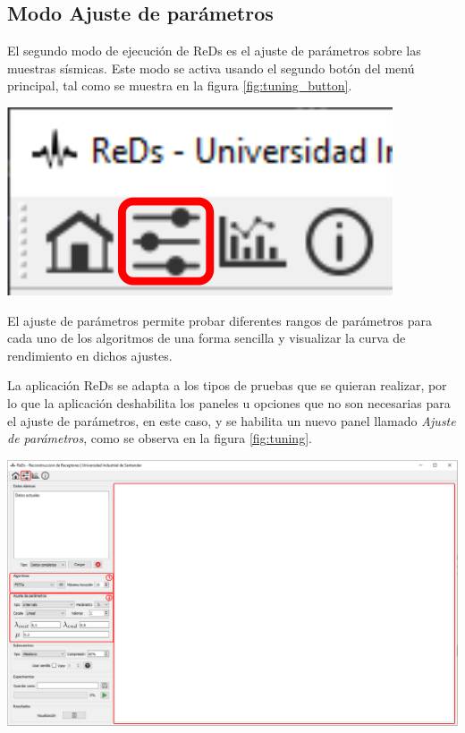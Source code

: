 \documentclass[12pt,twoside,letter]{ol-softwaremanual}
\newenvironment{Figure}
  {\par\medskip\noindent\minipage{\linewidth}}
  {\endminipage\par\medskip}
\begin{document}
\newpage
\subsection{Modo Ajuste de parámetros}

\begin{multicols}{2}

El segundo modo de ejecución de ReDs es el ajuste de parámetros sobre las muestras sísmicas. Este modo se activa usando el segundo botón del menú principal, tal como se muestra en la figura \ref{fig:tuning_button}.

\begin{Figure}
    \centering
    \includegraphics[width=0.4\linewidth]{tuning-tab.png}
    \label{fig:tuning_button}
\end{Figure}

\end{multicols}

El ajuste de parámetros permite probar diferentes rangos de parámetros para cada uno de los algoritmos de una forma sencilla y visualizar la curva de rendimiento en dichos ajustes.

La aplicación ReDs se adapta a los tipos de pruebas que se quieran realizar, por lo que la aplicación deshabilita los paneles u opciones que no son necesarias para el ajuste de parámetros, en este caso, y se habilita un nuevo panel llamado \emph{Ajuste de parámetros}, como se observa en la figura \ref{fig:tuning}.

\begin{Figure}
    \centering
    \includegraphics[width=1\linewidth]{tuning.pdf}
    \label{fig:tuning}
\end{Figure}
\end{document}
